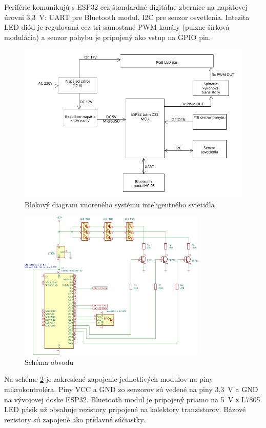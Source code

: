 \documentclass[12pt, a4paper]{article}
\begin{document}
Periférie komunikujú s ESP32 cez štandardné digitálne zbernice na napäťovej úrovni 3,3~V: UART pre Bluetooth modul, I2C pre senzor osvetlenia. Intezita LED diód je regulovaná cez tri samostané PWM kanály (pulzne-šírková modulácia) a senzor pohybu je pripojený ako vstup na GPIO pin.
\begin{figure}[h]
	\centering
	\includegraphics[width=\textwidth]{assets/block-diagram.png}
	\caption{Blokový diagram vnoreného systému inteligentného svietidla}
	\label{fig:block-diagram}
\end{figure}

\begin{figure}[h]
	\centering
	\includegraphics[width=0.8\textwidth]{assets/electrical-schematics.png}
	\caption{Schéma obvodu}
	\label{fig:electrical}
\end{figure}
Na schéme \ref{fig:electrical} je zakreslené zapojenie jednotlivých modulov na piny mikrokontroléra. Piny VCC a GND zo senzorov sú vedené na piny 3,3~V a GND na vývojovej doske ESP32. Bluetooth modul je pripojený priamo na 5~V z L7805. LED pásik už obsahuje rezistory pripojené na kolektory tranzistorov. Bázové rezistory sú zapojené ako prídavné súčiastky.
\FloatBarrier
\end{document}
